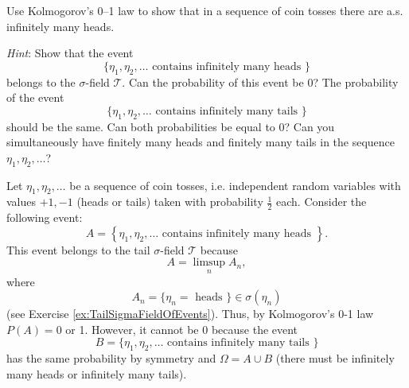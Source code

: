 \begin{Exercise}
\label{ex:InfinitelyManyHeads}
Use Kolmogorov's 0--1 law to show that in a sequence of coin tosses there are a.s. infinitely many heads.

\textit{Hint}: Show that the event
\[
\{\eta_{1}, \eta_{2}, \dots \text{ contains infinitely many heads }\}
\]
belongs to the $\sigma$-field $\mathcal{T}$. Can the probability of this event be 0? The probability of the event
\[
\{\eta_{1}, \eta_{2}, \dots \text{ contains infinitely many tails }\}
\]
should be the same. Can both probabilities be equal to 0? Can you simultaneously have finitely many heads and finitely many tails in the sequence $\eta_1, \eta_2, \ldots$?
\end{Exercise}

\begin{Solution}
\label{sol:Exercise49}
Let $\eta_1, \eta_2, \ldots$ be a sequence of coin tosses, i.e. independent random variables with values $+1, -1$ (heads or tails) taken with probability $\frac{1}{2}$ each. Consider the following event:
\[
A = \left\{\eta_{1}, \eta_{2}, \dots \text{ contains infinitely many heads } \right\}.
\]
This event belongs to the tail $\sigma$-field $\mathcal{T}$ because
\[
A = \limsup_{n} A_{n},
\]
where
\[
A_{n} = \{\eta_{n} = \text{ heads } \} \in \sigma (\eta_{n})
\]
(see Exercise \ref{ex:TailSigmaFieldOfEvents}). Thus, by Kolmogorov's 0-1 law $P(A) = 0$ or 1. However, it cannot be 0 because the event
\[
B = \{\eta_{1}, \eta_{2}, \dots \text{ contains infinitely many tails } \}
\]
has the same probability by symmetry and $\Omega = A\cup B$ (there must be infinitely many heads or infinitely many tails).
\end{Solution}

